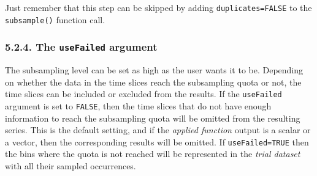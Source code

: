 \documentclass[]{article}
\begin{document}
Just remember that this step can be skipped by adding
\texttt{duplicates=FALSE} to the \texttt{subsample()} function call.

\subsubsection{\texorpdfstring{5.2.4. The \texttt{useFailed}
argument}{5.2.4. The useFailed argument}}\label{the-usefailed-argument}

The subsampling level can be set as high as the user wants it to be.
Depending on whether the data in the time slices reach the subsampling
quota or not, the time slices can be included or excluded from the
results. If the \texttt{useFailed} argument is set to \texttt{FALSE},
then the time slices that do not have enough information to reach the
subsampling quota will be omitted from the resulting series. This is the
default setting, and if the \emph{applied function} output is a scalar
or a vector, then the corresponding results will be omitted. If
\texttt{useFailed=TRUE} then the bins where the quota is not reached
will be represented in the \emph{trial dataset} with all their sampled
occurrences.
\end{document}
